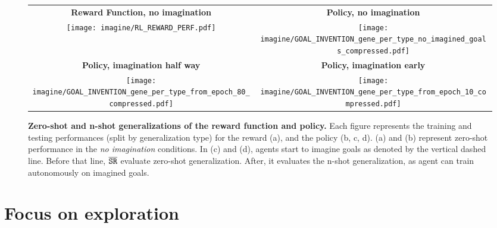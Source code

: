 \begin{figure*}[!h]
    \centering
    \begin{tabular}{cc}
    \textbf{Reward Function, no imagination} & \textbf{Policy, no imagination} \\
	\texttt{[image: imagine/RL\_REWARD\_PERF.pdf]} & \texttt{[image: imagine/GOAL\_INVENTION\_gene\_per\_type\_no\_imagined\_goals\_compressed.pdf]}\\
    \textbf{Policy, imagination half way} & \textbf{Policy, imagination early} \\
    \texttt{[image: imagine/GOAL\_INVENTION\_gene\_per\_type\_from\_epoch\_80\_compressed.pdf]} &\texttt{[image: imagine/GOAL\_INVENTION\_gene\_per\_type\_from\_epoch\_10\_compressed.pdf]}
    
    \end{tabular}
    
    \caption{\textbf{Zero-shot and n-shot generalizations of the reward function and policy.} Each figure represents the training and testing performances (split by generalization type) for the reward (a), and the policy (b, c, d). (a) and (b) represent zero-shot performance in the \textit{no imagination} conditions. In (c) and (d), agents start to imagine goals as denoted by the vertical dashed line. Before that line, $\overline{\mathtt{SR}}$ evaluate zero-shot generalization. After, it evaluates the n-shot generalization, as agent can train autonomously on imagined goals.\label{fig:suppl_gen}}
\end{figure*} 


\clearpage

\section{Focus on exploration}
\label{sec:suppl_exploration}
